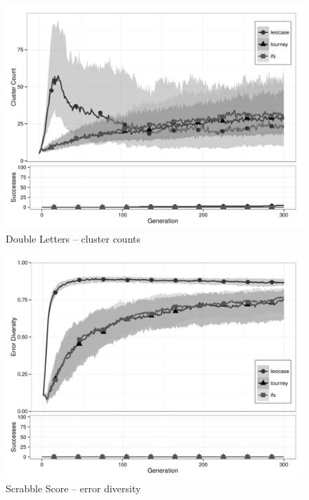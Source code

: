 \begin{figure}[p] %
\centering
\includegraphics[width=11.5cm]{double-letters-cluster.pdf}
\caption{Double Letters -- cluster counts}
\label{double-lettersClu}
\end{figure}

\begin{figure}[p] %
\centering
\includegraphics[width=11.5cm]{scrabble-score-diversity.pdf}
\caption{Scrabble Score -- error diversity}
\label{scrabble-scoreDiv}
\end{figure}


